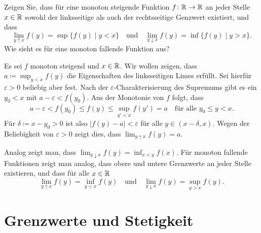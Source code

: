 \documentclass[a4paper,10pt]{article}
\begin{document}
\begin{question}
 Zeigen Sie, dass für eine monoton steigende Funktion $f \colon \mathbb{R} \to \mathbb{R}$ an jeder Stelle $x \in \mathbb{R}$ sowohl der linksseitige als auch der rechtsseitige Genzwert existiert, und dass
 \[
  \lim_{y \uparrow x} f(y) = \sup\{f(y) \mid y < x\}
  \quad
  \text{und}
  \quad
  \lim_{y \downarrow x} f(y) = \inf\{f(y) \mid y > x\}.
 \]
 Wie sieht es für eine monoton fallende Funktion aus?
\end{question}
\begin{solution}
 Es sei $f$ monoton steigend und $x \in \mathbb{R}$. Wir wollen zeigen, dass $a \coloneqq \sup_{y < x} f(y)$ die Eigenschaften des linksseitigen Limes erfüllt. Sei hierfür $\varepsilon > 0$ beliebig aber fest. Nach der $\varepsilon$-Charakterisierung des Supremums gibt es ein $y_0 < x$ mit $a-\varepsilon < f(y_0)$. Aus der Monotonie von $f$ folgt, dass
 \[
  a-\varepsilon < f(y_0) \leq f(y) \leq \sup_{y' < x} f(y') = a \quad \text{für alle $y_0 \leq y < x$}.
 \]
 Für $\delta \coloneqq x-y_0 > 0$ ist also $|f(y)-a| < \varepsilon$ für alle $y \in (x-\delta, x)$. Wegen der Beliebigkeit von $\varepsilon>0$ zeigt dies, dass $\lim_{y \uparrow x} f(y) = a$.
 
 Analog zeigt man, dass $\lim_{y \downarrow x} f(y) = \inf_{x < y} f(x)$. Für monoton fallende Funktionen zeigt man analog, dass obere und untere Grenzwerte an jeder Stelle existieren, und dass für alle $x \in \mathbb{R}$
 \[
  \lim_{y \uparrow x} f(y) = \inf_{y < x} f(y)
  \quad
  \text{und}
  \quad
  \lim_{y \downarrow x} f(y) = \sup_{y > x} f(y).
 \]
\end{solution}





\section{Grenzwerte und Stetigkeit}
\end{document}
